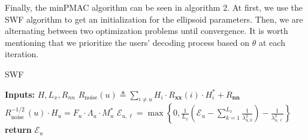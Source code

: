 

Finally, the minPMAC algorithm can be seen in algorithm 2. At first, we use the SWF algorithm to get an initialization for the ellipsoid parameters. Then, we are alternating between two optimization problems until convergence. It is worth mentioning that we prioritize the users' decoding process based on $\theta$ at each iteration.

        



\begin{algorithm}[t]
	\caption{SWF} 
    \State \textbf{Inputs:} $H, L_x, R_{nn}$
            \State $R_{\text {noise}}(u) \triangleq \sum_{i \neq u} H_i \cdot R_{\boldsymbol{x} \boldsymbol{x}}(i) \cdot H_i^*+R_{\boldsymbol{nn}}$
            \vspace{0.1cm}\State $R_{\text {noise }}^{-1 / 2}(u) \cdot H_u=F_u \cdot \Lambda_u \cdot M_u^*$
            \vspace{0.1cm}
                \State $\mathcal{E}_{u,\ell} = \operatorname{max} \left\{0, {\frac{1}{L_x}}\left(\mathcal{E}_u - \sum_{k=1}^{L_x}\frac{1}{\lambda_{u,k}^2}\right) - \frac{1}{\lambda_{u,\ell}^2}\right\}$
            \vspace{0.1cm}\EndFor
		\EndFor
\State \textbf{return} $\mathcal{E}_u$
\end{algorithm}


